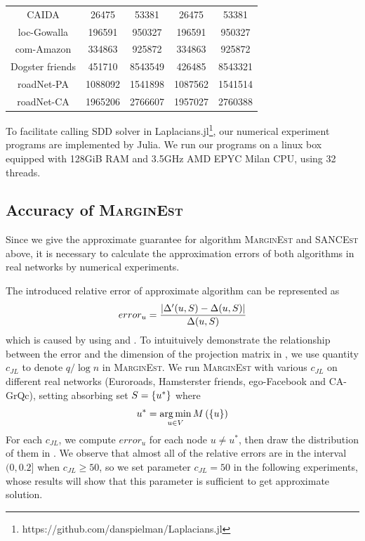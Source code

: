 \documentclass[sigconf]{acmart}
\begin{document}
\begin{table}
\begin{tabular}{ccccc}
        CAIDA               & 26475   & 53381   & 26475   & 53381   \\
        loc-Gowalla         & 196591  & 950327  & 196591  & 950327  \\
        com-Amazon          & 334863  & 925872  & 334863  & 925872  \\
        Dogster friends     & 451710  & 8543549 & 426485  & 8543321 \\
        roadNet-PA          & 1088092 & 1541898 & 1087562 & 1541514 \\
        roadNet-CA          & 1965206 & 2766607 & 1957027 & 2760388 \\
        \bottomrule
    \end{tabular}
\end{table}

To facilitate calling SDD solver in Laplacians.jl\footnote{https://github.com/danspielman/Laplacians.jl}, our numerical experiment programs are implemented by Julia.
We run our programs on a linux box equipped with 128GiB RAM and 3.5GHz AMD EPYC Milan CPU, using 32 threads.

\subsection{Accuracy of \textsc{MarginEst}}

Since we give the approximate guarantee for algorithm \textsc{MarginEst} and \textsc{SANCEst} above, it is necessary to calculate the approximation errors of both algorithms in real networks by numerical experiments.

The introduced relative error of approximate algorithm can be represented as
\[error_u=\frac{\left|\Delta'(u,S)-\Delta(u,S) \right|}{\Delta(u,S)}\]
which is caused by using  and .
To intuituively demonstrate the relationship between the error and the dimension of the projection matrix in , we use quantity \(c_{JL}\) to denote \(q/\log n\) in \textsc{MarginEst}.
We run \textsc{MarginEst} with various \(c_{JL}\) on different real networks (Euroroads, Hamsterster friends, ego-Facebook and CA-GrQc), setting absorbing set \(S=\left\{u^* \right\}\) where
\[u^*=\operatorname*{arg\,min}_{u\in V}M\left(\left\{u \right\}\right)\]
For each \(c_{JL}\), we compute \(error_u\) for each node \(u\neq u^*\), then draw the distribution of them in .
We observe that almost all of the relative errors are in the interval \((0,0.2]\) when \(c_{JL}\ge50\), so we set parameter \(c_{JL}=50\) in the following experiments, whose results will show that this parameter is sufficient to get approximate solution.
\end{document}
